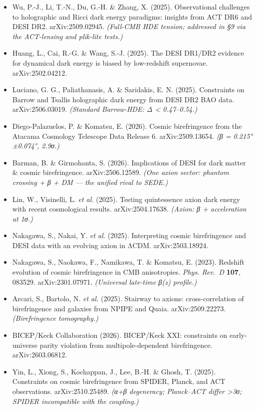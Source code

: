 \documentclass[
  10pt,
]{article}
\providecommand{\tightlist}{%
  \setlength{\itemsep}{0pt}\setlength{\parskip}{0pt}}
\begin{document}
\begin{itemize}
\tightlist
\item
  Wu, P.-J., Li, T.-N., Du, G.-H. \& Zhang, X. (2025). Observational
  challenges to holographic and Ricci dark energy paradigms: insights
  from ACT DR6 and DESI DR2. arXiv:2509.02945. \emph{(Full-CMB HDE
  tension; addressed in §9 via the ACT-lensing and plik-lite tests.)}
\item
  Huang, L., Cai, R.-G. \& Wang, S.-J. (2025). The DESI DR1/DR2 evidence
  for dynamical dark energy is biased by low-redshift supernovae.
  arXiv:2502.04212.
\item
  Luciano, G. G., Paliathanasis, A. \& Saridakis, E. N. (2025).
  Constraints on Barrow and Tsallis holographic dark energy from DESI
  DR2 BAO data. arXiv:2506.03019. \emph{(Standard Barrow-HDE: Δ
  \textless{} 0.47--0.54.)}
\item
  Diego-Palazuelos, P. \& Komatsu, E. (2026). Cosmic birefringence from
  the Atacama Cosmology Telescope Data Release 6. arXiv:2509.13654.
  \emph{(β = 0.215°±0.074°, 2.9σ.)}
\item
  Barman, B. \& Girmohanta, S. (2026). Implications of DESI for dark
  matter \& cosmic birefringence. arXiv:2506.12589. \emph{(One axion
  sector: phantom crossing + β + DM --- the unified rival to SEDE.)}
\item
  Lin, W., Visinelli, L. \emph{et al.} (2025). Testing quintessence
  axion dark energy with recent cosmological results. arXiv:2504.17638.
  \emph{(Axion: β + acceleration at 1σ.)}
\item
  Nakagawa, S., Nakai, Y. \emph{et al.} (2025). Interpreting cosmic
  birefringence and DESI data with an evolving axion in ΛCDM.
  arXiv:2503.18924.
\item
  Nakagawa, S., Naokawa, F., Namikawa, T. \& Komatsu, E. (2023).
  Redshift evolution of cosmic birefringence in CMB anisotropies.
  \emph{Phys. Rev.~D} \textbf{107}, 083529. arXiv:2301.07971.
  \emph{(Universal late-time β(z) profile.)}
\item
  Arcari, S., Bartolo, N. \emph{et al.} (2025). Stairway to axions:
  cross-correlation of birefringence and galaxies from NPIPE and Quaia.
  arXiv:2509.22273. \emph{(Birefringence tomography.)}
\item
  BICEP/Keck Collaboration (2026). BICEP/Keck XXI: constraints on
  early-universe parity violation from multipole-dependent
  birefringence. arXiv:2603.06812.
\item
  Yin, L., Xiong, S., Kochappan, J., Lee, B.-H. \& Ghosh, T. (2025).
  Constraints on cosmic birefringence from SPIDER, Planck, and ACT
  observations. arXiv:2510.25489. \emph{(α+β degeneracy; Planck--ACT
  differ \textgreater3σ; SPIDER incompatible with the coupling.)}
\end{itemize}
\end{document}
